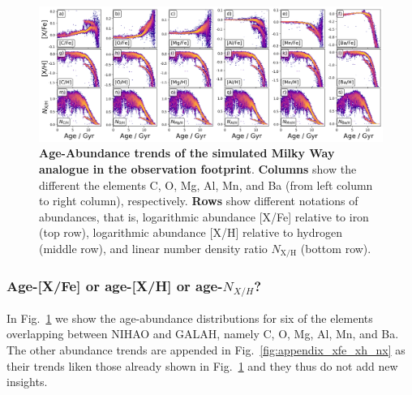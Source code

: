 \documentclass[fleqn,usenatbib]{mnras}
\begin{document}
\begin{figure}
	\includegraphics[width=\textwidth]{figures/age_xfe_xh_nxh.png}
    \caption{
    \textbf{Age-Abundance trends of the simulated Milky Way analogue in the observation footprint}.
    \textbf{Columns} show the different the elements C, O, Mg, Al, Mn, and Ba (from left column to right column), respectively.
    \textbf{Rows} show different notations of abundances, that is, logarithmic abundance {[X/Fe]} relative to iron (top row), logarithmic abundance {[X/H]} relative to hydrogen (middle row), and linear number density ratio {$N_\mathrm{X/H}$} (bottom row).
    }
    \label{fig:age_xfe_xh_nxh}
\end{figure}

\subsubsection{Age-[X/Fe] or age-[X/H] or age-$N_{X/H}$?} \label{sec:age_xfe_xh_nxh}

In Fig.~\ref{fig:age_xfe_xh_nxh} we show the age-abundance distributions for six of the elements overlapping between NIHAO and GALAH, namely C, O, Mg, Al, Mn, and Ba. The other abundance trends are appended in Fig.~\ref{fig:appendix_xfe_xh_nx} as their trends liken those already shown in Fig.~\ref{fig:age_xfe_xh_nxh} and they thus do not add new insights.
\end{document}
